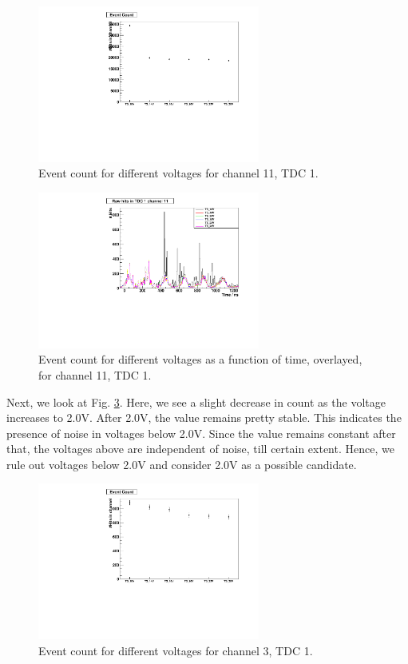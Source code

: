 \documentclass[a4paper]{report}
\numberwithin{equation}{section}
\begin{document}
\begin{figure}[htpb]
    \centering
    \includegraphics[width=0.65\textwidth]{StyxThresholdScan_1_11_Rate.pdf}
    \caption{Event count for different voltages for channel 11, TDC 1.}
    \label{fig:remove_10}
\end{figure}

\begin{figure}[htpb]
    \centering
    \includegraphics[width=0.65\textwidth]{StyxThresholdScan_1_11_Overlay.pdf}
    \caption{Event count for different voltages as a function of time, overlayed, for channel 11, TDC 1.}
    \label{fig:remove_10_1}
\end{figure}

Next, we look at Fig. \ref{fig:rm_below_20}. Here, we see a slight decrease in count as the voltage increases to 2.0V. After 2.0V, the value remains pretty stable. This indicates the presence of noise in voltages below 2.0V. Since the value remains constant after that, the voltages above are independent of noise, till certain extent. Hence, we rule out voltages below 2.0V and consider 2.0V as a possible candidate. 

\begin{figure}[htpb]
    \centering
    \includegraphics[width=0.65\textwidth]{StyxThresholdScan_1_3_Rate.pdf}
    \caption{Event count for different voltages for channel 3, TDC 1.}
    \label{fig:rm_below_20}
\end{figure}
\end{document}
